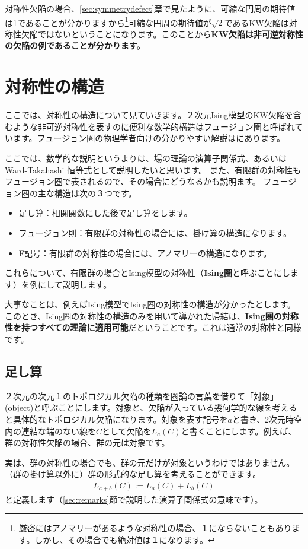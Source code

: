 \documentclass[report,paper=a4, fontsize=12pt, line_length=16cm, number_of_lines=33,dvipdfmx]{jlreq}
\newcommand{\kyou}[1]{{\sffamily \bfseries #1}}
\numberwithin{equation}{chapter}
\begin{document}
対称性欠陥の場合、\ref{sec:symmetrydefect}章で見たように、可縮な円周の期待値は1であることが分かりますから\footnote{厳密にはアノマリーがあるような対称性の場合、１にならないこともあります。しかし、その場合でも絶対値は１になります。}可縮な円周の期待値が$\sqrt{2}$であるKW欠陥は対称性欠陥ではないということになります。このことから\kyou{KW欠陥は非可逆対称性の欠陥の例であることが分かります。}

\section{対称性の構造}
ここでは、対称性の構造について見ていきます。２次元Ising模型のKW欠陥を含むような非可逆対称性を表すのに便利な数学的構造はフュージョン圏と呼ばれています。フュージョン圏の物理学者向けの分かりやすい解説は\cite{Bhardwaj:2017xup}にあります。

ここでは、数学的な説明というよりは、場の理論の演算子関係式、あるいはWard-Takahashi 恒等式として説明したいと思います。
また、有限群の対称性もフュージョン圏で表されるので、その場合にどうなるかも説明ます。
フュージョン圏の主な構造は次の３つです。
\begin{itemize}
  \item 足し算：相関関数にした後で足し算をします。
  \item フュージョン則：有限群の対称性の場合には、掛け算の構造になります。
  \item F記号：有限群の対称性の場合には、アノマリーの構造になります。
\end{itemize}
これらについて、有限群の場合とIsing模型の対称性（\kyou{Ising圏}と呼ぶことにします）を例にして説明します。

大事なことは、例えばIsing模型でIsing圏の対称性の構造が分かったとします。このとき、Ising圏の対称性の構造のみを用いて導かれた帰結は、\kyou{Ising圏の対称性を持つすべての理論に適用可能}だということです。これは通常の対称性と同様です。

\subsection{足し算}

２次元の次元１のトポロジカル欠陥の種類を圏論の言葉を借りて「対象」(object)と呼ぶことにします。対象と、欠陥が入っている幾何学的な線を考えると具体的なトポロジカル欠陥になります。対象を表す記号を$a$と書き、2次元時空内の連結な端のない線を$C$として欠陥を$L_{a}(C)$と書くことにします。例えば、群の対称性欠陥の場合、群の元は対象です。

実は、群の対称性の場合でも、群の元だけが対象というわけではありません。（群の掛け算以外に）群の形式的な足し算を考えることができます。
\begin{align}
  L_{a+b}(C):=L_{a}(C)+L_{b}(C)\label{objectplus}
\end{align}
と定義します（\ref{sec:remarks}節で説明した演算子関係式の意味です）。
\end{document}
